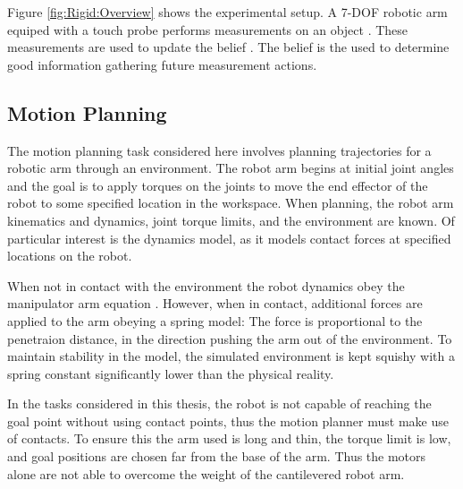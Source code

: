 \documentclass[../thesis.tex]{subfiles}
\begin{document}

Figure \ref{fig:Rigid:Overview} shows the experimental setup.
A 7-DOF robotic arm equiped with a touch probe performs measurements on an object .
These measurements are used to update the belief . The belief is the used to determine good information gathering future measurement actions.


\subsection{Motion Planning}
The motion planning task considered here involves planning trajectories for a robotic arm through an environment.
The robot arm begins at initial joint angles and the goal is to apply torques on the joints to move the end effector of the robot to some specified location in the workspace.
When planning, the robot arm kinematics and dynamics, joint torque limits, and the environment are known.
Of particular interest is the dynamics model, as it models contact forces at specified locations on the robot.

When not in contact with the environment the robot dynamics obey the manipulator arm equation \cite{murray1994mathematical}.
However, when in contact, additional forces are applied to the arm obeying a spring model: The force is proportional to the penetraion distance, in the direction pushing the arm out of the environment.
To maintain stability in the model, the simulated environment is kept squishy with a spring constant significantly lower than the physical reality.

In the tasks considered in this thesis, the robot is not capable of reaching the goal point without using contact points, thus the motion planner must make use of contacts.
To ensure this the arm used is long and thin, the torque limit is low, and goal positions are chosen far from the base of the arm.
Thus the motors alone are not able to overcome the weight of the cantilevered robot arm.
\end{document}
